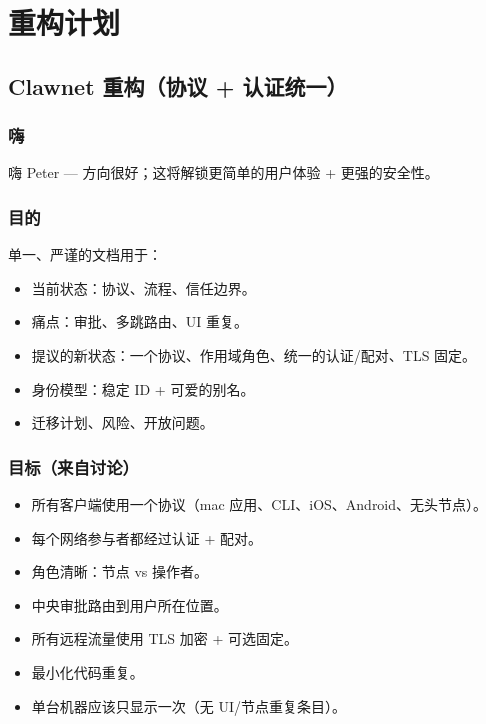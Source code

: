 \chapter{重构计划}

\section{Clawnet 重构（协议 + 认证统一）}


\subsection{嗨}


嗨 Peter — 方向很好；这将解锁更简单的用户体验 + 更强的安全性。

\subsection{目的}


单一、严谨的文档用于：

\begin{itemize}
  \item 当前状态：协议、流程、信任边界。
  \item 痛点：审批、多跳路由、UI 重复。
  \item 提议的新状态：一个协议、作用域角色、统一的认证/配对、TLS 固定。
  \item 身份模型：稳定 ID + 可爱的别名。
  \item 迁移计划、风险、开放问题。
\end{itemize}


\subsection{目标（来自讨论）}


\begin{itemize}
  \item 所有客户端使用一个协议（mac 应用、CLI、iOS、Android、无头节点）。
  \item 每个网络参与者都经过认证 + 配对。
  \item 角色清晰：节点 vs 操作者。
  \item 中央审批路由到用户所在位置。
  \item 所有远程流量使用 TLS 加密 + 可选固定。
  \item 最小化代码重复。
  \item 单台机器应该只显示一次（无 UI/节点重复条目）。
\end{itemize}


